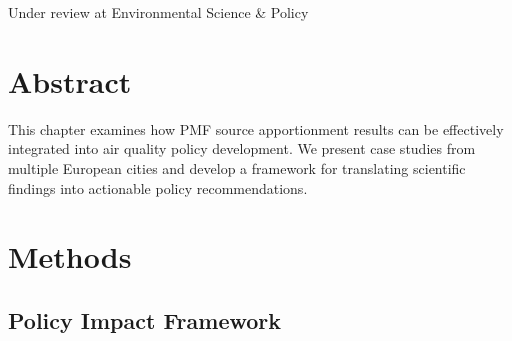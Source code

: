 \documentclass[
  letterpaper,
  oneside,
  openany]{MastersDoctoralThesis}
\theoremstyle{plain}
\theoremstyle{remark}
\begin{document}
Under review at Environmental Science \& Policy

\section{Abstract}\label{abstract-2}

This chapter examines how PMF source apportionment results can be
effectively integrated into air quality policy development. We present
case studies from multiple European cities and develop a framework for
translating scientific findings into actionable policy recommendations.

\section{Methods}\label{methods-1}

\subsection{Policy Impact Framework}\label{policy-impact-framework}
\end{document}
